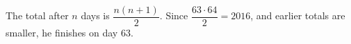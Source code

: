 The total after $n$ days is $\dfrac{n(n+1)}{2}$. Since $\dfrac{63\cdot64}{2}=2016$, and earlier totals are smaller, he finishes on day $\boxed{63}$.
